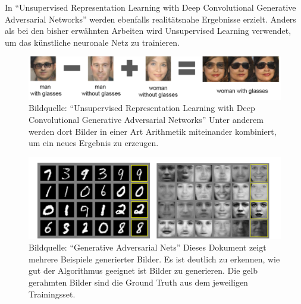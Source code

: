 In ``Unsupervised Representation Learning with Deep Convolutional Generative Adversarial Networks'' \cite{radford2016unsupervised} werden ebenfalls
realitätsnahe Ergebnisse erzielt. Anders als bei den bisher erwähnten Arbeiten
wird Unsupervised Learning verwendet, um das künstliche neuronale Netz zu trainieren.

\begin{figure}[h]
	\centering
	\includegraphics[width=1.0\textwidth]{bilder/image_arithmetic.png}
	\caption[Bildarithmetik]{Bildquelle: ``Unsupervised Representation Learning with Deep Convolutional Generative Adversarial Networks'' \cite{radford2016unsupervised} \newline Unter anderem werden dort Bilder in einer Art Arithmetik miteinander kombiniert, um ein neues Ergebnis zu erzeugen.}
	\label{fig:unsupervisedexamples}
\end{figure}

\begin{figure}[h]
	\centering
	\includegraphics[width=1.0\textwidth]{bilder/mnist_faces.png}
	\caption[GAN Beispielbilder]{Bildquelle: ``Generative Adversarial Nets'' \cite{goodfellow2014generative} \newline Dieses Dokument zeigt mehrere Beispiele generierter Bilder. Es ist deutlich zu erkennen, wie gut der Algorithmus geeignet ist Bilder zu generieren. Die gelb gerahmten Bilder sind die Ground Truth aus dem jeweiligen Trainingsset.}
	\label{fig:ganexamples}
\end{figure}

\pagebreak

\begin{figure}[h]
	\centering
	\hspace{.5cm}
	\hspace{.5cm}
	\label{fig:pix2pixexamples_1}
\end{figure}

